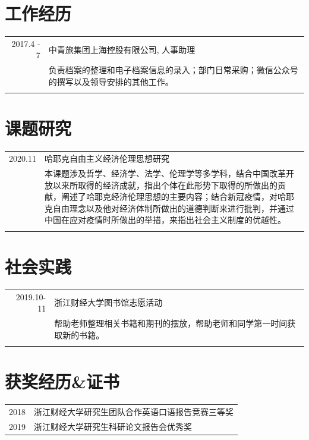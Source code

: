 \documentclass[a4paper,11pt]{article}
\begin{document}
\section{工作经历}
\begin{tabular}{r|p{11cm}}
 \textsc{2017.4 - 7} & 中青旅集团上海控股有限公司, 人事助理 \\&负责档案的整理和电子档案信息的录入；部门日常采购；微信公众号的撰写以及领导安排的其他工作。\\\multicolumn{2}{c}{} \\
\end{tabular}

\section{课题研究}
\begin{tabular}{r|p{11cm}}
\textsc{2020.11} & 哈耶克自由主义经济伦理思想研究\\&本课题涉及哲学、经济学、法学、伦理学等多学科，结合中国改革开放以来所取得的经济成就，指出个体在此形势下取得的所做出的贡献，阐述了哈耶克经济伦理思想的主要内容；结合新冠疫情，对哈耶克自由理念以及他对经济体制所做出的道德判断来进行批判，并通过中国在应对疫情时所做出的举措，来指出社会主义制度的优越性。\\\multicolumn{2}{c}{} \\
\end{tabular}

\section{社会实践}
\begin{tabular}{r|p{11cm}}
\textsc{2019.10-11} & 浙江财经大学图书馆志愿活动\\&帮助老师整理相关书籍和期刊的摆放，帮助老师和同学第一时间获取新的书籍。\\\multicolumn{2}{c}{} \\
\end{tabular}

\section{获奖经历\&证书}
\begin{tabular}{rl}
 \textsc{2018}  & 浙江财经大学研究生团队合作英语口语报告竞赛三等奖\\
 \textsc{2019} & 浙江财经大学研究生科研论文报告会优秀奖\\

\end{tabular}
\end{document}
